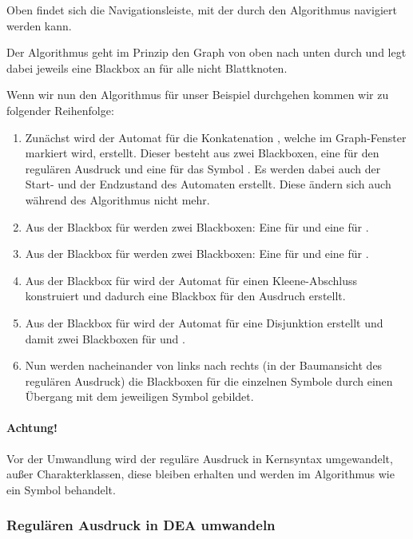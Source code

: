 Oben findet sich die Navigationsleiste, mit der durch den Algorithmus navigiert werden kann.

Der Algorithmus geht im Prinzip den Graph von oben nach unten durch und legt dabei jeweils eine Blackbox an für alle nicht Blattknoten. 

Wenn wir nun den Algorithmus für unser Beispiel durchgehen kommen wir zu folgender Reihenfolge:
\begin{enumerate}
  \item Zunächst wird der Automat für die Konkatenation , welche im Graph-Fenster markiert wird, erstellt. Dieser besteht aus zwei Blackboxen, eine für den regulären Ausdruck  und eine für das Symbol . Es werden dabei auch der Start- und der Endzustand des Automaten erstellt. Diese ändern sich auch während des Algorithmus nicht mehr.
  \item Aus der Blackbox für  werden zwei Blackboxen: Eine für  und eine für .
  \item Aus der Blackbox für  werden zwei Blackboxen: Eine für  und eine für .
  \item Aus der Blackbox für  wird der Automat für einen Kleene-Abschluss konstruiert und dadurch eine Blackbox für den Ausdruch  erstellt.
  \item Aus der Blackbox für  wird der Automat für eine Disjunktion erstellt und damit zwei Blackboxen für  und .
  \item Nun werden nacheinander von links nach rechts (in der Baumansicht des regulären Ausdruck) die Blackboxen für die einzelnen Symbole durch einen Übergang mit dem jeweiligen Symbol gebildet.
\end{enumerate}

\paragraph*{Achtung!} Vor der Umwandlung wird der reguläre Ausdruck in Kernsyntax umgewandelt, außer Charakterklassen, diese bleiben erhalten und werden im Algorithmus wie ein Symbol behandelt.


\subsubsection{Regulären Ausdruck in DEA umwandeln}

